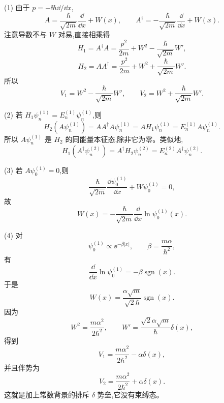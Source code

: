 \begin{solution}
(1) 由于 $p=-\ii\hbar\dd/\dd x$,
\[
A=\frac{\hbar}{\sqrt{2m}}\frac{\dd}{\dd x}+W(x),
\qquad
A^\dagger=-\frac{\hbar}{\sqrt{2m}}\frac{\dd}{\dd x}+W(x).
\]
注意导数不与 $W$ 对易,直接相乘得
\[
H_1=A^\dagger A=\frac{p^2}{2m}+W^2-\frac{\hbar}{\sqrt{2m}}W',
\]
\[
H_2=AA^\dagger=\frac{p^2}{2m}+W^2+\frac{\hbar}{\sqrt{2m}}W'.
\]
所以
\[
\boxed{V_1=W^2-\frac{\hbar}{\sqrt{2m}}W',
\qquad
V_2=W^2+\frac{\hbar}{\sqrt{2m}}W'.}
\]

(2) 若 $H_1\psi_n^{(1)}=E_n^{(1)}\psi_n^{(1)}$,则
\[
H_2(A\psi_n^{(1)})=AA^\dagger A\psi_n^{(1)}=A H_1\psi_n^{(1)}
=E_n^{(1)}A\psi_n^{(1)}.
\]
所以 $A\psi_n^{(1)}$ 是 $H_2$ 的同能量本征态,除非它为零。类似地,
\[
H_1(A^\dagger\psi_n^{(2)})=A^\dagger H_2\psi_n^{(2)}
=E_n^{(2)}A^\dagger\psi_n^{(2)}.
\]

(3) 若 $A\psi_0^{(1)}=0$,则
\[
\frac{\hbar}{\sqrt{2m}}\frac{\dd\psi_0^{(1)}}{\dd x}+W\psi_0^{(1)}=0,
\]
故
\[
\boxed{W(x)=-\frac{\hbar}{\sqrt{2m}}\frac{\dd}{\dd x}\ln\psi_0^{(1)}(x).}
\]

(4) 对
\[
\psi_0^{(1)}\propto \ee^{-\beta|x|},
\qquad
\beta=\frac{m\alpha}{\hbar^2},
\]
有
\[
\frac{\dd}{\dd x}\ln\psi_0^{(1)}=-\beta\operatorname{sgn}(x).
\]
于是
\[
\boxed{W(x)=\frac{\alpha\sqrt m}{\sqrt2\hbar}\operatorname{sgn}(x).}
\]
因为
\[
W^2=\frac{m\alpha^2}{2\hbar^2},
\qquad
W'=\frac{\sqrt2\alpha\sqrt m}{\hbar}\delta(x),
\]
得到
\[
V_1=\frac{m\alpha^2}{2\hbar^2}-\alpha\delta(x),
\]
并且伴势为
\[
\boxed{V_2=\frac{m\alpha^2}{2\hbar^2}+\alpha\delta(x).}
\]
这就是加上常数背景的排斥 $\delta$ 势垒,它没有束缚态。
\end{solution}

